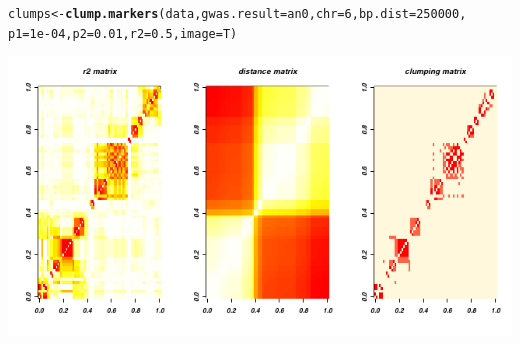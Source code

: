 \documentclass[12pt,a4paper,oneside]{article}\usepackage[]{graphicx}\usepackage[]{color}
\makeatletter
\newcommand{\hlnum}[1]{\textcolor[rgb]{0.686,0.059,0.569}{#1}}%
\newcommand{\hlstd}[1]{\textcolor[rgb]{0.345,0.345,0.345}{#1}}%
\newcommand{\hlkwb}[1]{\textcolor[rgb]{0.69,0.353,0.396}{#1}}%
\newcommand{\hlkwc}[1]{\textcolor[rgb]{0.333,0.667,0.333}{#1}}%
\newcommand{\hlkwd}[1]{\textcolor[rgb]{0.737,0.353,0.396}{\textbf{#1}}}%
\newenvironment{kframe}{%
 \def\at@end@of@kframe{}%
 \ifinner\ifhmode%
  \def\at@end@of@kframe{\end{minipage}}%
  \begin{minipage}{\columnwidth}%
 \fi\fi%
 \def\FrameCommand##1{\hskip\@totalleftmargin \hskip-\fboxsep
 \colorbox{shadecolor}{##1}\hskip-\fboxsep
     \hskip-\linewidth \hskip-\@totalleftmargin \hskip\columnwidth}%
 \MakeFramed {\advance\hsize-\width
   \@totalleftmargin\z@ \linewidth\hsize
   \@setminipage}}%
 {\par\unskip\endMakeFramed%
 \at@end@of@kframe}
\newenvironment{knitrout}{}{} %
\makeatother
\begin{document}
\begin{knitrout}\footnotesize
{}\color{fgcolor}\begin{kframe}
\begin{alltt}
\hlstd{clumps} \hlkwb{<-} \hlkwd{clump.markers}\hlstd{(data,} \hlkwc{gwas.result} \hlstd{= an0,} \hlkwc{chr} \hlstd{=} \hlnum{6}\hlstd{,} \hlkwc{bp.dist} \hlstd{=} \hlnum{250000}\hlstd{,}
    \hlkwc{p1} \hlstd{=} \hlnum{1e-04}\hlstd{,} \hlkwc{p2} \hlstd{=} \hlnum{0.01}\hlstd{,} \hlkwc{r2} \hlstd{=} \hlnum{0.5}\hlstd{,} \hlkwc{image} \hlstd{= T)}
\end{alltt}
\end{kframe}

{\centering \includegraphics[width=1.0\textwidth]{images/clump_markers} 

}



\end{knitrout}
\end{document}
